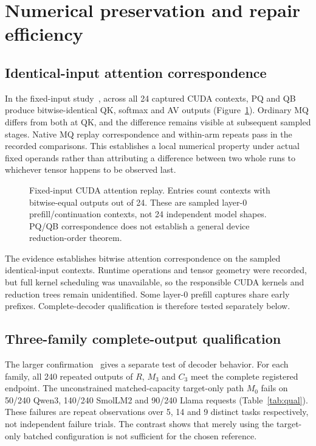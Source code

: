 \section{Numerical preservation and repair efficiency}
\label{sec:evaluation}
\subsection{Identical-input attention correspondence}
In the fixed-input study~\cite{rtxrepair}, across all 24 captured CUDA contexts, PQ and QB produce bitwise-identical QK, softmax and AV outputs (Figure~\ref{fig:numeric}). Ordinary MQ differs from both at QK, and the difference remains visible at subsequent sampled stages. Native MQ replay correspondence and within-arm repeats pass in the recorded comparisons. This establishes a local numerical property under actual fixed operands rather than attributing a difference between two whole runs to whichever tensor happens to be observed last.

\begin{figure}[t]
\centering
\caption{Fixed-input CUDA attention replay. Entries count contexts with bitwise-equal outputs out of 24. These are sampled layer-0 prefill/continuation contexts, not 24 independent model shapes. PQ/QB correspondence does not establish a general device reduction-order theorem.}
\label{fig:numeric}
\end{figure}

The evidence establishes bitwise attention correspondence on the sampled identical-input contexts. Runtime operations and tensor geometry were recorded, but full kernel scheduling was unavailable, so the responsible CUDA kernels and reduction trees remain unidentified. Some layer-0 prefill captures share early prefixes. Complete-decoder qualification is therefore tested separately below.

\subsection{Three-family complete-output qualification}
The larger confirmation~\cite{rtxconfirm} gives a separate test of decoder behavior. For each family, all 240 repeated outputs of $R$, $M_3$ and $C_3$ meet the complete registered endpoint. The unconstrained matched-capacity target-only path $M_0$ fails on 50/240 Qwen3, 140/240 SmolLM2 and 90/240 Llama requests (Table~\ref{tab:qual}). These failures are repeat observations over 5, 14 and 9 distinct tasks respectively, not independent failure trials. The contrast shows that merely using the target-only batched configuration is not sufficient for the chosen reference.

